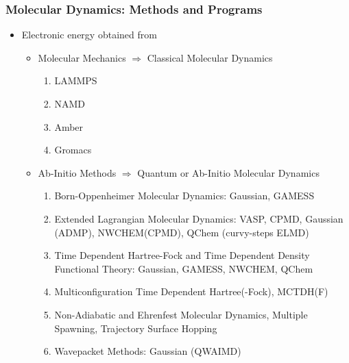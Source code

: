 \documentclass[slidestop,mathserif,compress,xcolor=svgnames]{beamer}
\begin{document}
\begin{frame}
\frametitle{\small Molecular Dynamics: Methods and Programs}
\begin{itemize}
\item Electronic energy obtained from 
\begin{itemize}
\item Molecular Mechanics $\Rightarrow$ Classical Molecular Dynamics
{\footnotesize
\begin{enumerate}
\item LAMMPS
\item NAMD
\item Amber
\item Gromacs
\end{enumerate}
}
\item Ab-Initio Methods $\Rightarrow$ Quantum or Ab-Initio Molecular Dynamics
{\footnotesize
\begin{enumerate}
\item Born-Oppenheimer Molecular Dynamics: Gaussian, GAMESS
\item Extended Lagrangian Molecular Dynamics: VASP, CPMD, Gaussian (ADMP), NWCHEM(CPMD), {\color{red}QChem (curvy-steps ELMD)}
\item Time Dependent Hartree-Fock and Time Dependent Density Functional Theory: Gaussian, GAMESS, NWCHEM, {\color{red}QChem}
\item {\color{red}Multiconfiguration Time Dependent Hartree(-Fock), MCTDH(F)}
\item {\color{red}Non-Adiabatic and  Ehrenfest Molecular Dynamics, Multiple Spawning, Trajectory Surface Hopping}
\item {\color{red} Wavepacket Methods: Gaussian (QWAIMD)}
\end{enumerate}
}
\end{itemize}
\end{itemize}
\end{frame}
\end{document}
